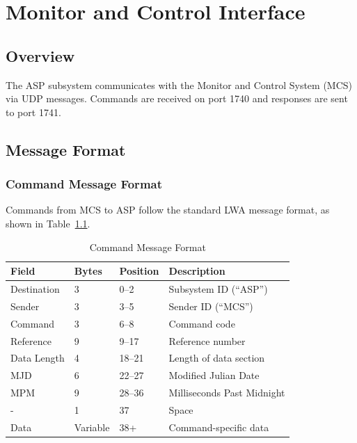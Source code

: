 
\chapter{Monitor and Control Interface}
\label{sec:monitor-control}

\section{Overview}

The ASP subsystem communicates with the Monitor and Control System (MCS) via UDP messages. Commands are received on port 1740 and responses are sent to port 1741.

\section{Message Format}

\subsection{Command Message Format}

Commands from MCS to ASP follow the standard LWA message format, as shown in Table~\ref{tab:cmd-format}.

\begin{table}[htbp]
    \centering
    \caption{Command Message Format}
    \label{tab:cmd-format}
    \begin{tabular}{llll}
        \toprule
        \textbf{Field} & \textbf{Bytes} & \textbf{Position} & \textbf{Description} \\
        \midrule
        Destination & 3 & 0--2 & Subsystem ID (``ASP'') \\
        Sender & 3 & 3--5 & Sender ID (``MCS'') \\
        Command & 3 & 6--8 & Command code \\
        Reference & 9 & 9--17 & Reference number \\
        Data Length & 4 & 18--21 & Length of data section \\
        MJD & 6 & 22--27 & Modified Julian Date \\
        MPM & 9 & 28--36 & Milliseconds Past Midnight \\
        - & 1 & 37 & Space \\
        Data & Variable & 38+ & Command-specific data \\
        \bottomrule
    \end{tabular}
\end{table}

